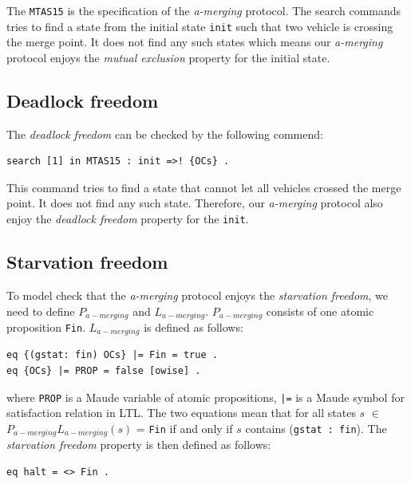 \documentclass[10pt, conference, compsocconf]{IEEEtran}
\begin{document}
The \verb!MTAS15! is the specification of the \textit{a-merging} protocol.
The search commands tries to find a state from the initial state \verb!init! such that two vehicle is crossing the merge point.
It does not find any such states which means our \textit{a-merging} protocol enjoys the \textit{mutual exclusion} property for the initial state.


\subsection{Deadlock freedom}
The \textit{deadlock freedom} can be checked by the following commend:

\begin{small}
\begin{verbatim}
search [1] in MTAS15 : init =>! {OCs} .
\end{verbatim}
\end{small}

This command tries to find a state that cannot let all vehicles crossed the merge point. 
It does not find any such state.
Therefore, our \textit{a-merging} protocol also enjoy the \textit{deadlock freedom} property for the \verb!init!.


\subsection{Starvation freedom}
To model check that the \textit{a-merging} protocol enjoys the \textit{starvation freedom}, we need to define $P_{a-merging}$ and $L_{a-merging}$. 
$P_{a-merging}$ consists of one atomic proposition \verb!Fin!.
$L_{a-merging}$ is defined as follows:

\begin{small}
\begin{verbatim}
eq {(gstat: fin) OCs} |= Fin = true .
eq {OCs} |= PROP = false [owise] .
\end{verbatim}
\end{small}

where \verb!PROP! is a Maude variable of atomic propositions, \verb!|=! is a Maude symbol for satisfaction relation in LTL. 
The two equations mean that for all states $s$ $\in$ $P_{a-merging}L_{a-merging}(s)$ = {\verb!Fin!} if and only if $s$ contains (\verb!gstat : fin!). 
The \textit{starvation freedom} property is then defined as follows:

\begin{small}
\begin{verbatim}
eq halt = <> Fin .
\end{verbatim}
\end{small}
\end{document}

